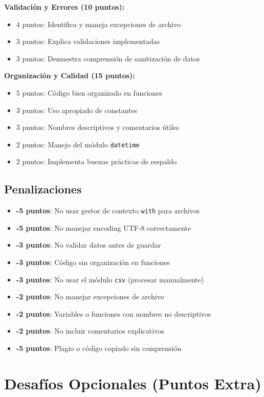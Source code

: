\documentclass[11pt,letterpaper]{article}
\begin{document}
\textbf{Validación y Errores (10 puntos):}
\begin{itemize}
    \item 4 puntos: Identifica y maneja excepciones de archivo
    \item 3 puntos: Explica validaciones implementadas
    \item 3 puntos: Demuestra comprensión de sanitización de datos
\end{itemize}

\textbf{Organización y Calidad (15 puntos):}
\begin{itemize}
    \item 5 puntos: Código bien organizado en funciones
    \item 3 puntos: Uso apropiado de constantes
    \item 3 puntos: Nombres descriptivos y comentarios útiles
    \item 2 puntos: Manejo del módulo \texttt{datetime}
    \item 2 puntos: Implementa buenas prácticas de respaldo
\end{itemize}

\subsection{Penalizaciones}

\begin{itemize}
    \item \textbf{-5 puntos}: No usar gestor de contexto \texttt{with} para archivos
    \item \textbf{-5 puntos}: No manejar encoding UTF-8 correctamente
    \item \textbf{-3 puntos}: No validar datos antes de guardar
    \item \textbf{-3 puntos}: Código sin organización en funciones
    \item \textbf{-3 puntos}: No usar el módulo \texttt{csv} (procesar manualmente)
    \item \textbf{-2 puntos}: No manejar excepciones de archivo
    \item \textbf{-2 puntos}: Variables o funciones con nombres no descriptivos
    \item \textbf{-2 puntos}: No incluir comentarios explicativos
    \item \textbf{-5 puntos}: Plagio o código copiado sin comprensión
\end{itemize}

\section{Desafíos Opcionales (Puntos Extra)}
\end{document}
